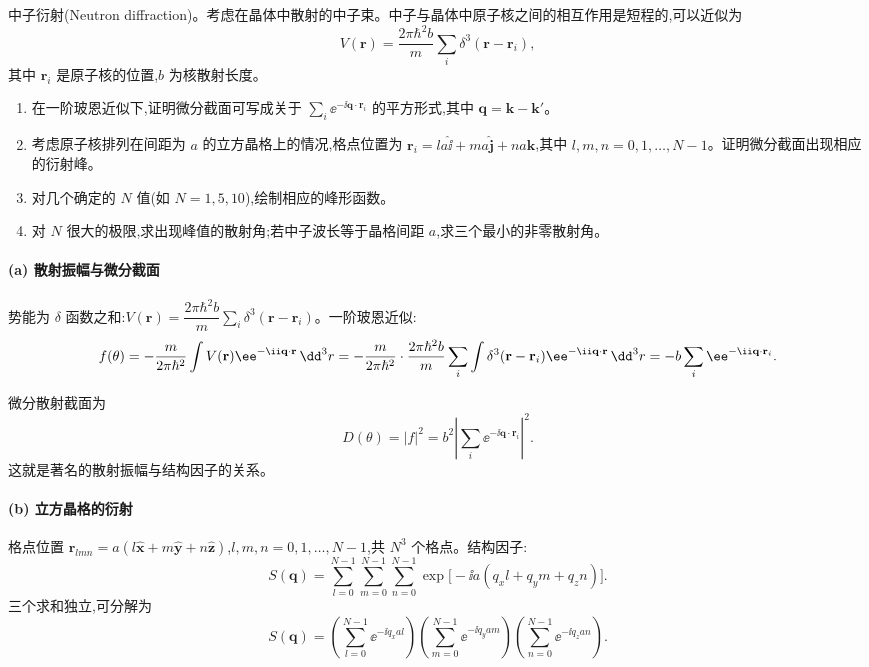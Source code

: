 \begin{question}
中子衍射(Neutron diffraction)。考虑在晶体中散射的中子束。中子与晶体中原子核之间的相互作用是短程的,可以近似为
\[
V(\mathbf r)=\frac{2\pi\hbar^2 b}{m}\sum_i\delta^3(\mathbf r-\mathbf r_i),
\]
其中 $\mathbf r_i$ 是原子核的位置,$b$ 为核散射长度。
\begin{enumerate}
\item 在一阶玻恩近似下,证明微分截面可写成关于 $\sum_i \ee^{-\ii\mathbf q\cdot\mathbf r_i}$ 的平方形式,其中 $\mathbf q=\mathbf k-\mathbf k'$。
\item 考虑原子核排列在间距为 $a$ 的立方晶格上的情况,格点位置为 $\mathbf r_i=l a\hat{\mathbf \ii}+m a\hat{\mathbf j}+n a\hat{\mathbf k}$,其中 $l,m,n=0,1,\ldots,N-1$。证明微分截面出现相应的衍射峰。
\item 对几个确定的 $N$ 值(如 $N=1,5,10$),绘制相应的峰形函数。
\item 对 $N$ 很大的极限,求出现峰值的散射角;若中子波长等于晶格间距 $a$,求三个最小的非零散射角。
\end{enumerate}
\begin{solution}
\paragraph{(a) 散射振幅与微分截面}

势能为 $\delta$ 函数之和:$V(\mathbf r)=\dfrac{2\pi\hbar^2 b}{m}\sum_i\delta^3(\mathbf r-\mathbf r_i)$。一阶玻恩近似:
\[
f(\theta)=-{m\over2\pi\hbar^2}\int V(\mathbf r)\ee^{-\ii\mathbf q\cdot\mathbf r}\,\dd^3r
=-{m\over2\pi\hbar^2}\cdot{2\pi\hbar^2 b\over m}\sum_i\int\delta^3(\mathbf r-\mathbf r_i)\ee^{-\ii\mathbf q\cdot\mathbf r}\,\dd^3r
=-b\sum_i \ee^{-\ii\mathbf q\cdot\mathbf r_i}.
\]

微分散射截面为
\[
\boxed{D(\theta)=|f|^2=b^2\left|\sum_i \ee^{-\ii\mathbf q\cdot\mathbf r_i}\right|^2.}
\]
这就是著名的散射振幅与结构因子的关系。

\paragraph{(b) 立方晶格的衍射}

格点位置 $\mathbf r_{lmn}=a(l\hat{\mathbf x}+m\hat{\mathbf y}+n\hat{\mathbf z})$,$l,m,n=0,1,\ldots,N-1$,共 $N^3$ 个格点。结构因子:
\[
S(\mathbf q)=\sum_{l=0}^{N-1}\sum_{m=0}^{N-1}\sum_{n=0}^{N-1}
\exp\bigl[-\ii a(q_x l+q_y m+q_z n)\bigr].
\]
三个求和独立,可分解为
\[
S(\mathbf q)=\left(\sum_{l=0}^{N-1}\ee^{-\ii q_x a l}\right)
\left(\sum_{m=0}^{N-1}\ee^{-\ii q_y a m}\right)
\left(\sum_{n=0}^{N-1}\ee^{-\ii q_z a n}\right).
\]


\end{solution}
\end{question}
